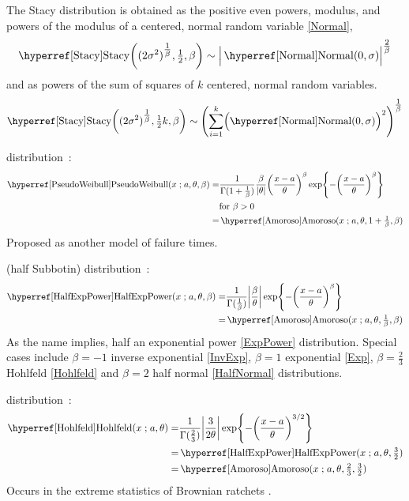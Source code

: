 The Stacy distribution is obtained as the positive even powers,  modulus, and powers of the modulus of a centered, normal random variable \eqref{Normal}, 
\[
\opr{Stacy}\Left((2\sigma^2)^{\tfrac{1}{\beta}} ,\tfrac{1}{2}, \beta\Right) \sim \Big|\opr{Normal}(0,\sigma)\Big|^{\tfrac{2}{\beta}}
\notag
\checked
\]
and as powers of the sum of squares of $k$ centered, normal random variables. 
\[
\opr{Stacy}\Left( (2\sigma^2)^{\tfrac{1}{\beta}} ,\tfrac{1}{2}k, \beta\Right) \sim  \Left( \sum_{i=1}^{k} \Bigl(\opr{Normal}(0,\sigma)\Bigr)^2\Right)^{\tfrac{1}{\beta}}
\notag
\checked
\]



 distribution~\cite{Voda1989}:
\begin{align}
\label{PseudoWeibull}
\opr{PseudoWeibull}(x\given a, \theta,\beta)  
=& \frac{1}{\Gamma(1+\tfrac{1}{\beta})} \frac{\beta}{|\theta|} \Left(\frac{x-a}{\theta}\Right)^{\beta} 
\exp \Left\{ -\Left(\frac{x-a}{\theta}\Right)^{\beta} \Right\} \checked
\\ & \text{for } \beta>0 \notag 
\\=&  \opr{Amoroso}(x\given  a, \theta, 1+\tfrac{1}{\beta}, \beta) \notag \checked
\end{align}
Proposed as another model of failure times. 

 (half Subbotin) distribution~\cite{Gui2013}:
\begin{align}
\label{HalfExpPower}
\opr{HalfExpPower}(x\given a, \theta,\beta)
=& 
\frac{1}{\Gamma(\tfrac{1}{\beta})} 
\Left|\frac{\beta}{\theta}\Right|
\exp \Left\{
-  \Left(\frac{x-a}{\theta}\Right)^{\beta}
\Right\} \checked
\\=&  \opr{Amoroso}(x\given  a, \theta,\tfrac{1}{\beta}, \beta) \notag \checked
\end{align}
As the name implies, half an exponential power \eqref{ExpPower} distribution. Special cases include $\beta=-1$ inverse exponential  \eqref{InvExp}, $\beta=1$ exponential \eqref{Exp}, $\beta=\tfrac{2}{3}$ Hohlfeld  \eqref{Hohlfeld}  and $\beta=2$ half normal \eqref{HalfNormal} distributions. 

 distribution~\cite{Hohlfeld2014}:
\begin{align}
\label{Hohlfeld}
\opr{Hohlfeld}(x\given a, \theta)
=& 
\frac{1}{\Gamma(\tfrac{2}{3})} 
\Left|\frac{3}{2\theta}\Right|
\exp \Left\{
-  \Left(\frac{x-a}{\theta}\Right)^{3/2}
\Right\} \checked
\\=&  \opr{HalfExpPower}(x\given a, \theta,\tfrac{3}{2}) \notag \checked
\\=&  \opr{Amoroso}(x\given  a, \theta,\tfrac{2}{3}, \tfrac{3}{2}) \notag \checked
\end{align}
Occurs in the extreme statistics of Brownian ratchets  \cite[Suppl. p.5]{Hohlfeld2014}.





